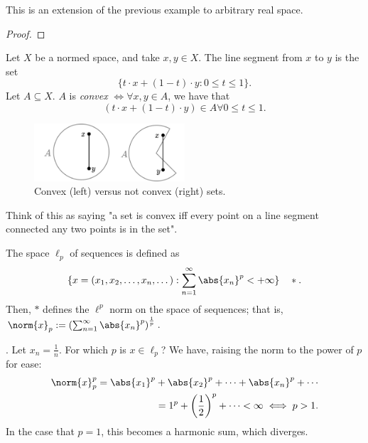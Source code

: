 \begin{remark}
    This is an extension of the previous example to arbitrary real space.
\end{remark}

\begin{proof}
\end{proof}

\begin{definition}
    Let $X$ be a normed space, and take $x, y \in X$. The line segment from $x$ to $y$ is the set \[
    \{t \cdot x  + (1 - t)\cdot y: 0 \leq t \leq 1\} .
    \]
    Let $A \subseteq X$. $A$ is \emph{convex} $\iff \forall x,y \in A$, we have that $$(t \cdot x + (1- t)\cdot y) \in A \forall 0 \leq t \leq 1.$$
\end{definition}

\begin{figure}[!ht]
    \centering
    \includegraphics[width=0.5\textwidth]{misc/convex.png}
    \caption{Convex (left) versus not convex (right) sets.}
\end{figure}

\begin{remark}
    Think of this as saying "a set is convex iff every point on a line segment connected any two points is in the set".
\end{remark}

\begin{definition}[$\ell_p$]
    The space $\ell_p$ of sequences is defined as \[
    \{x = (x_1, x_2, \dots, x_n, \dots) : \sum_{n=1}^{\infty} \abs{x_n}^p < + \infty\} \quad \ast.
    \]
    Then, $\ast$ defines the $\ell^p$ norm on the space of sequences; that is, $\norm{x}_p := \left(\sum_{n = 1}^\infty \abs{x_n}^p\right)^{\frac{1}{p}}$.
\end{definition}

\begin{example}[$\ell_p$, $x_n = \frac{1}{n}$].
   Let $x_n = \frac{1}{n}$. For which $p$ is $x \in \ell_p$? We have, raising the norm to the power of $p$ for ease:
   \begin{align*}
    \norm{x}_p^p = \abs{x_1}^p + \abs{x_2}^p + \cdots + \abs{x_n}^p + \cdots\\
    = 1^p + \left(\frac{1}{2}\right)^p + \cdots < \infty \iff p > 1.
   \end{align*}
   In the case that $p = 1$, this becomes a harmonic sum, which diverges.
\end{example}

